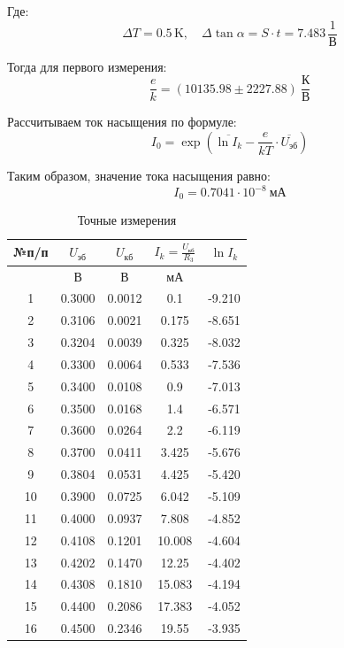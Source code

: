 Где:
\[
\Delta T = 0.5 \, \text{K}, \quad \Delta \tan \alpha = S \cdot t = 7.483 \, \frac{1}{\text{В}}
\]

Тогда для первого измерения:
\[
\frac{e}{k} = (10135.98 \pm 2227.88)~\frac{\text{К}}{\text{В}}
\]

Рассчитываем ток насыщения по формуле:
\begin{equation}
I_0 = \exp\left( \overline{\ln I_k} - \frac{e}{kT} \cdot \overline{U_{\text{эб}}} \right)
\end{equation}


Таким образом, значение тока насыщения равно:
\[
I_0 = 0.7041 \cdot 10^{-8}~\text{мА}
\]

\clearpage

\begin{center}
\begin{table}[h!]
\centering
\caption{Точные измерения}
\label{tabl:3}
\begin{tabular}{|c|c|c|c|c|}
\hline
 №п/п &
\begin{minipage}{2cm}
    $U_{\text{эб}}$
\end{minipage} &
\begin{minipage}{2cm}
    $U_{\text{кб}}$
\end{minipage} &
\begin{minipage}{2cm}
    $I_k = \frac{U_{\text{кб}}}{R_3}$
\end{minipage} &
\begin{minipage}{2cm}
    $\ln I_k$
\end{minipage}\\
\hline
{}&В&В&мА&{}\\
\hline
1& 0.3000&0.0012&0.1&-9.210 \\
2&0.3106&0.0021&0.175&-8.651 \\
3&0.3204&0.0039&0.325&-8.032 \\
4&0.3300&0.0064&0.533&-7.536 \\
5&0.3400&0.0108&0.9&-7.013 \\
6&0.3500&0.0168&1.4&-6.571 \\
7&0.3600&0.0264&2.2&-6.119 \\
8&0.3700&0.0411&3.425&-5.676 \\
9&0.3804&0.0531&4.425&-5.420 \\
10 &0.3900&0.0725&6.042&-5.109 \\
11 &0.4000&0.0937&7.808&-4.852 \\
12 &0.4108&0.1201&10.008&-4.604 \\
13 &0.4202&0.1470&12.25&-4.402 \\
14 &0.4308&0.1810&15.083&-4.194 \\
15& 0.4400&0.2086&17.383&-4.052 \\
16& 0.4500&0.2346&19.55&-3.935 \\
\hline
\end{tabular}
\end{table}
\end{center}
